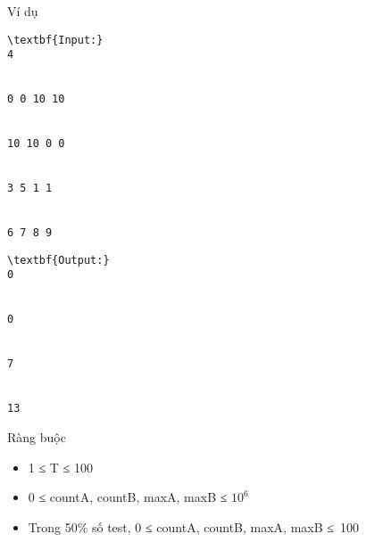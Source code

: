 Ví dụ
\begin{verbatim}
\textbf{Input:}
4


0 0 10 10


10 10 0 0


3 5 1 1


6 7 8 9 \end{verbatim}
\begin{verbatim}
\textbf{Output:}
0


0


7


13 \end{verbatim}
Ràng buộc
\begin{itemize}
	\item     1 ≤ T ≤ 100   
	\item     0 ≤ countA, countB, maxA, maxB ≤ $10^{6}$
	\item     Trong 50\% số test, 0 ≤ countA, countB, maxA, maxB ≤ 100   
\end{itemize}